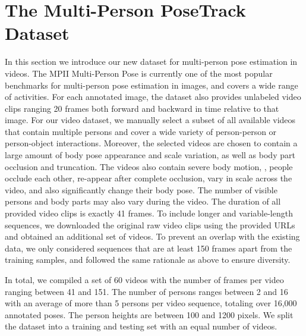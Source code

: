 \documentclass[10pt,twocolumn,letterpaper]{article}
\begin{document}
\section{The Multi-Person PoseTrack Dataset}\label{sed:data}
In this section we introduce our new dataset for multi-person pose estimation in videos. The MPII Multi-Person Pose \cite{andriluka_cvpr2014} is currently one of the most popular benchmarks for multi-person pose estimation in images, and covers a wide range of activities. For each annotated image, the dataset also provides unlabeled video clips ranging 20 frames both forward and backward in time relative to that image. For our video dataset, we manually select a subset of all available videos that contain multiple persons and cover a wide variety of person-person or person-object interactions. Moreover, the selected videos are chosen to contain a large amount of body pose appearance and scale variation, as well as body part occlusion and truncation. The videos also contain severe body motion, \ie, people occlude each other, re-appear after complete occlusion, vary in scale across the video, and also significantly change their body pose. The number of visible persons and body parts may also vary during the video. 
The duration of all provided video clips is exactly 41 frames. To include longer and variable-length sequences, we downloaded the original raw video clips using the provided URLs and obtained an additional set of videos. To prevent an overlap with the existing data, we only considered sequences that are at least 150 frames apart from the training samples, and followed the same rationale as above to ensure diversity.

In total, we compiled a set of 60 videos with the number of frames per video ranging between 41 and 151. The number of persons ranges between 2 and 16 with an average of more than 5 persons per video sequence, totaling over 16,000 annotated poses. The person heights are between 100 and 1200 pixels. We split the dataset into a training and testing set with an equal number of videos.  
\end{document}
